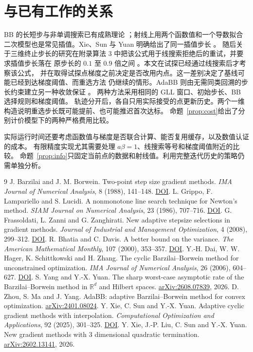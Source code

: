 \documentclass[UTF8,11pt]{ctexart}
\newcommand{\R}{\mathbb{R}}
\begin{document}
\section{与已有工作的关系}
BB 的长短步与非单调搜索已有成熟理论 \cite{bb,gll,fh}；射线上用两个函数值和一个导数拟合
二次模型也是常见插值。Xie、Sun 与 Yuan 明确给出了同一插值步长 \cite[式 (16)]{xsy}。
随后关于三维终止步长的研究在附录算法 3 中把该公式用于线搜索拒绝后的重试，并要求插值步长落在
原步长的 $0.1$ 至 $0.9$ 倍之间 \cite{three}。本文在试探已经通过线搜索后才考察该公式，
并在取得试探点梯度之前决定是否改用内点。这一差别决定了基线可能已经到达梯度阈值、而重选方法
仍继续的情形。AdaBB 则由无需同类回溯的步长约束建立另一种收敛保证 \cite{adabb}。
两种方法采用相同的 GLL 窗口、初始步长、BB 选择规则和梯度阈值。
轨迹分开后，各自只用实际接受的点更新历史。两个一维构造说明重选步长既可能提前、也可能推迟首次达标。
命题~\ref{prop:cost}给出了分别计价模型下的两种严格费用比较。

实际运行时间还要考虑函数值与梯度是否联合计算、能否复用缓存，以及数值认证的成本。
有限精度实现尤其需要处理 $a\beta=1$、线搜索等号和梯度阈值附近的比较。
命题~\ref{prop:info}只固定当前点的数据和射线值。利用完整迭代历史的策略仍需单独分析。

\begin{thebibliography}{9}
 J. Barzilai and J. M. Borwein. Two-point step size gradient methods.
\emph{IMA Journal of Numerical Analysis}, 8 (1988), 141--148.
\href{https://doi.org/10.1093/imanum/8.1.141}{DOI}.
 L. Grippo, F. Lampariello and S. Lucidi. A nonmonotone line search technique for Newton's method.
\emph{SIAM Journal on Numerical Analysis}, 23 (1986), 707--716.
\href{https://doi.org/10.1137/0723046}{DOI}.
 G. Frassoldati, L. Zanni and G. Zanghirati. New adaptive stepsize selections in gradient methods.
\emph{Journal of Industrial and Management Optimization}, 4 (2008), 299--312.
\href{https://doi.org/10.3934/jimo.2008.4.299}{DOI}.
 R. Bhatia and C. Davis. A better bound on the variance.
\emph{The American Mathematical Monthly}, 107 (2000), 353--357.
\href{https://doi.org/10.1080/00029890.2000.12005203}{DOI}.
 Y.-H. Dai, W. W. Hager, K. Schittkowski and H. Zhang. The cyclic Barzilai--Borwein method for unconstrained optimization.
\emph{IMA Journal of Numerical Analysis}, 26 (2006), 604--627.
\href{https://doi.org/10.1093/imanum/drl006}{DOI}.
 S. Yang and Y.-X. Yuan. The sharp worst-case asymptotic rate of the Barzilai--Borwein method in
$\R^d$ and Hilbert spaces. \href{https://arxiv.org/abs/2608.07839}{arXiv:2608.07839}, 2026.
 D. Zhou, S. Ma and J. Yang. AdaBB: adaptive Barzilai--Borwein method for convex optimization.
\href{https://arxiv.org/abs/2401.08024}{arXiv:2401.08024}.
 Y. Xie, C. Sun and Y.-X. Yuan. Adaptive cyclic gradient methods with interpolation.
\emph{Computational Optimization and Applications}, 92 (2025), 301--325.
\href{https://doi.org/10.1007/s10589-025-00691-y}{DOI}.
 Y. Xie, J.-P. Liu, C. Sun and Y.-X. Yuan. New gradient methods with 3 dimensional quadratic termination.
\href{https://arxiv.org/abs/2602.13141}{arXiv:2602.13141}, 2026.
\end{thebibliography}
\end{document}
